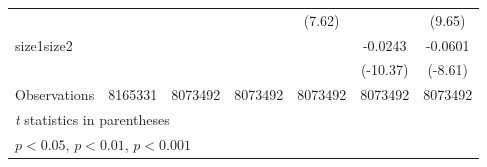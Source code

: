 {\begin{tabular}{l*{6}{c}}
                    &                     &                     &                     &      (7.62)         &                     &      (9.65)         \\
[1em]
size1size2          &                     &                     &                     &                     &     -0.0243\sym{***}&     -0.0601\sym{***}\\
                    &                     &                     &                     &                     &    (-10.37)         &     (-8.61)         \\
\hline
Observations        &     8165331         &     8073492         &     8073492         &     8073492         &     8073492         &     8073492         \\
\hline\hline
\multicolumn{7}{l}{\footnotesize \textit{t} statistics in parentheses}\\
\multicolumn{7}{l}{\footnotesize \sym{*} \(p<0.05\), \sym{**} \(p<0.01\), \sym{***} \(p<0.001\)}\\
\end{tabular}
}
